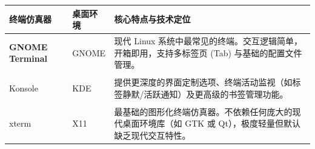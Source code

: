 \documentclass[border=15pt]{standalone}
\begin{document}
\sffamily
\renewcommand{\arraystretch}{1.5}

\begin{tabularx}{16cm}{>{\bfseries}p{3.5cm} p{1.5cm} X}
	\rowcolor{headerbg}
	\toprule
	\textcolor{headertext}{\textbf{终端仿真器}} & \textcolor{headertext}{\textbf{桌面环境}} & \textcolor{headertext}{\textbf{核心特点与技术定位}}                           \\
	\midrule

	GNOME Terminal                         & GNOME                                 & 现代 Linux 系统中最常见的终端。交互逻辑简单，开箱即用，支持多标签页 (Tab) 与基础的配置文件管理。 \\
	\addlinespace[1ex]

	Konsole                                & KDE                                   & 提供更深度的界面定制选项、终端活动监视（如标签静默/活跃通知）及更高级的书签管理功能。       \\
	\addlinespace[1ex]

	xterm                                  & X11                                   & 最基础的图形化终端仿真器。不依赖任何庞大的现代桌面环境库（如 GTK 或 Qt），极度轻量但默认缺乏现代交互特性。        \\

	\bottomrule
\end{tabularx}
\end{document}
